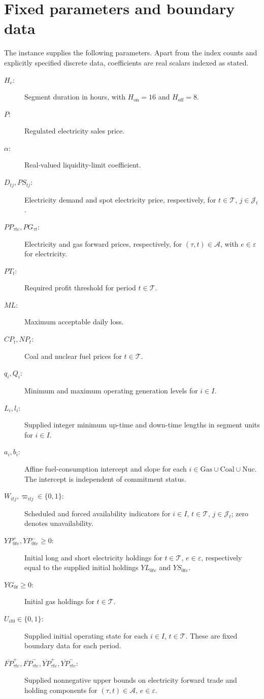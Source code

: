 \documentclass[11pt,a4paper]{article}
\begin{document}
\section*{Fixed parameters and boundary data}
The instance supplies the following parameters. Apart from the index counts and explicitly specified discrete data, coefficients are real scalars indexed as stated.
\begin{description}
\item[$H_e$:] Segment duration in hours, with $H_{\mathrm{on}}=16$ and $H_{\mathrm{off}}=8$.
\item[$P$:] Regulated electricity sales price.
\item[$\alpha$:] Real-valued liquidity-limit coefficient.
\item[$D_{tj},PS_{tj}$:] Electricity demand and spot electricity price, respectively, for $t\in\mathcal T$, $j\in\mathcal J_t$.
\item[$PP_{\tau te},PG_{\tau t}$:] Electricity and gas forward prices, respectively, for $(\tau,t)\in\mathcal A$, with $e\in\varepsilon$ for electricity.
\item[$PT_t$:] Required profit threshold for period $t\in\mathcal T$.
\item[$ML$:] Maximum acceptable daily loss.
\item[$CP_t,NP_t$:] Coal and nuclear fuel prices for $t\in\mathcal T$.
\item[$q_i,Q_i$:] Minimum and maximum operating generation levels for $i\in I$.
\item[$L_i,l_i$:] Supplied integer minimum up-time and down-time lengths in segment units for $i\in I$.
\item[$a_i,b_i$:] Affine fuel-consumption intercept and slope for each $i\in\mathrm{Gas}\cup\mathrm{Coal}\cup\mathrm{Nuc}$. The intercept is independent of commitment status.
\item[$W_{itj},\varpi_{itj}\in\{0,1\}$:] Scheduled and forced availability indicators for $i\in I$, $t\in\mathcal T$, $j\in\mathcal J_t$; zero denotes unavailability.
\item[$YP_{0te}^{+},YP_{0te}^{-}\ge0$:] Initial long and short electricity holdings for $t\in\mathcal T$, $e\in\varepsilon$, respectively equal to the supplied initial holdings $YL_{0te}$ and $YS_{0te}$.
\item[$YG_{0t}\ge0$:] Initial gas holdings for $t\in\mathcal T$.
\item[$U_{it0}\in\{0,1\}$:] Supplied initial operating state for each $i\in I$, $t\in\mathcal T$. These are fixed boundary data for each period.
\item[$\overline{FP}_{\tau te}^{+},\overline{FP}_{\tau te}^{-},\overline{YP}_{\tau te}^{+},\overline{YP}_{\tau te}^{-}$:] Supplied nonnegative upper bounds on electricity forward trade and holding components for $(\tau,t)\in\mathcal A$, $e\in\varepsilon$.
\end{description}
\end{document}
